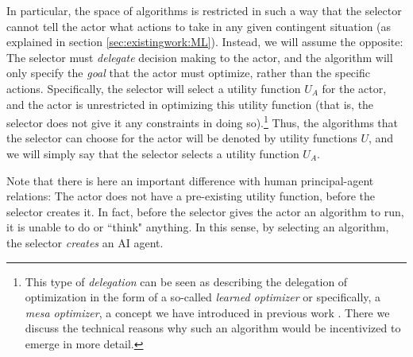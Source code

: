 In particular, the space of algorithms is restricted in such a way that the selector cannot tell the actor what actions to take in any given contingent situation (as explained in section \ref{sec:existingwork:ML}). Instead, we will assume the opposite: The selector must \textit{delegate} decision making to the actor, and the algorithm will only specify the \textit{goal} that the actor must optimize, rather than the specific actions. Specifically, the selector will select a utility function $U_A$ for the actor, and the actor is unrestricted in optimizing this utility function (that is, the selector does not give it any constraints in doing so).\footnote{This type of \textit{delegation} can be seen as describing the delegation of optimization in the form of a so-called \textit{learned optimizer} or specifically, a \textit{mesa optimizer}, a concept we have introduced in previous work \citep{Hubinger2019}. There we discuss the technical reasons why such an algorithm would be incentivized to emerge in more detail.  } Thus, the algorithms that the selector can choose for the actor will be denoted by utility functions $U$, and we will simply say that the selector selects a utility function $U_A$.



Note that there is here an important difference with human principal-agent relations: The actor does not have a pre-existing utility function, before the selector creates it. In fact, before the selector gives the actor an algorithm to run, it is unable to do or ``think" anything. In this sense, by selecting an algorithm, the selector \textit{creates} an AI agent.%

